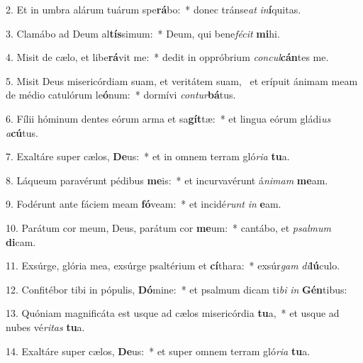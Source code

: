 2. Et in umbra alárum tuárum spe\textbf{rá}bo:~*  donec tránse\textit{at} \textit{in}\textbf{í}quitas.\

3. Clamábo ad Deum al\textbf{tís}simum:~*  Deum, qui bene\textit{fé}\textit{cit} \textbf{mi}hi.\

4. Misit de cælo, et libe\textbf{rá}vit me:~*  dedit in oppróbrium \textit{con}\textit{cul}\textbf{cán}tes me.\

5. Misit Deus misericórdiam suam, et veritátem suam, \dag\  et erípuit ánimam meam de médio catulórum le\textbf{ó}num:~*  dormívi \textit{con}\textit{tur}\textbf{bá}tus.\

6. Fílii hóminum dentes eórum arma et sa\textbf{gít}tæ:~*  et lingua eórum gládi\textit{us} \textit{a}\textbf{cú}tus.\

7. Exaltáre super cælos, \textbf{De}us:~*  et in omnem terram gló\textit{ri}\textit{a} \textbf{tu}a.\

8. Láqueum paravérunt pédibus \textbf{me}is:~*  et incurvavérunt á\textit{ni}\textit{mam} \textbf{me}am.\

9. Fodérunt ante fáciem meam \textbf{fó}veam:~*  et incidé\textit{runt} \textit{in} \textbf{e}am.\

10. Parátum cor meum, Deus, parátum cor \textbf{me}um:~*  cantábo, et \textit{psal}\textit{mum} \textbf{di}cam.\

11. Exsúrge, glória mea, exsúrge psaltérium et \textbf{cí}thara:~*  exsúr\textit{gam} \textit{di}\textbf{lú}culo.\

12. Confitébor tibi in pópulis, \textbf{Dó}mine:~*  et psalmum dicam ti\textit{bi} \textit{in} \textbf{Gén}tibus:\

13. Quóniam magnificáta est usque ad cælos misericórdia \textbf{tu}a,~*  et usque ad nubes vé\textit{ri}\textit{tas} \textbf{tu}a.\

14. Exaltáre super cælos, \textbf{De}us:~*  et super omnem terram gló\textit{ri}\textit{a} \textbf{tu}a.\

